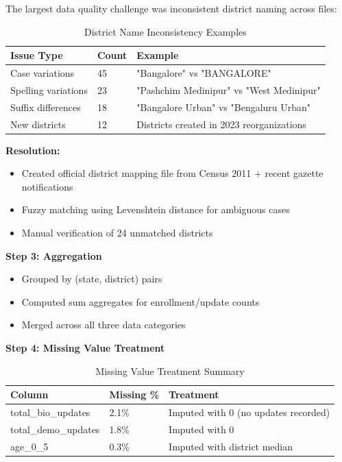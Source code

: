 \documentclass[11pt, a4paper]{article}
\begin{document}
The largest data quality challenge was inconsistent district naming across files:


\vspace{0.8em}
\begin{table}[H]
\caption{District Name Inconsistency Examples}
{\small
\begin{tabularx}{\textwidth}{|Y|Y|Y|}
\hline
\textbf{Issue Type} & \textbf{Count} & \textbf{Example} \\ \hline
Case variations & 45 & "Bangalore" vs "BANGALORE" \\ \hline
Spelling variations & 23 & "Pashchim Medinipur" vs "West Medinipur" \\ \hline
Suffix differences & 18 & "Bangalore Urban" vs "Bengaluru Urban" \\ \hline
New districts & 12 & Districts created in 2023 reorganizations \\ \hline
\end{tabularx}
}
\end{table}
\vspace{1em}

\textbf{Resolution:}


\begin{itemize}
\item Created official district mapping file from Census 2011 + recent gazette notifications

\item Fuzzy matching using Levenshtein distance for ambiguous cases

\item Manual verification of 24 unmatched districts
\end{itemize}

\textbf{Step 3: Aggregation}


\begin{itemize}
\item Grouped by (state, district) pairs

\item Computed sum aggregates for enrollment/\allowbreak update counts

\item Merged across all three data categories
\end{itemize}

\textbf{Step 4: Missing Value Treatment}


\vspace{0.8em}
\begin{table}[H]
\caption{Missing Value Treatment Summary}
{\small
\begin{tabularx}{\textwidth}{|Y|Y|Y|}
\hline
\textbf{Column} & \textbf{Missing \%} & \textbf{Treatment} \\ \hline
total\_bio\_updates & 2.1\% & Imputed with 0 (no updates recorded) \\ \hline
total\_demo\_updates & 1.8\% & Imputed with 0 \\ \hline
age\_0\_5 & 0.3\% & Imputed with district median \\ \hline
\end{tabularx}
}
\end{table}
\vspace{1em}
\end{document}
